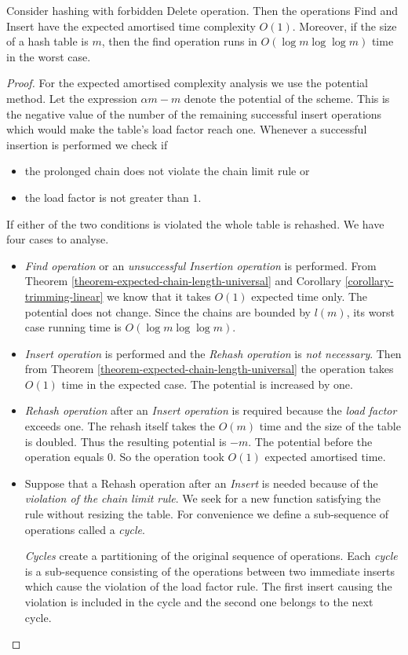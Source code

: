\begin{theorem}
\label{theorem-no-delete-time}
Consider hashing with forbidden Delete operation. Then the operations Find and Insert have the expected amortised time complexity $O(1)$. Moreover, if the size of a hash table is $m$, then the find operation runs in $O(\log m \log \log m)$ time in the worst case.
\end{theorem}
\begin{proof}
For the expected amortised complexity analysis we use the potential method. Let the expression $\alpha m - m$ denote the potential of the scheme. This is the negative value of the number of the remaining successful insert operations which would make the table's load factor reach one. Whenever a successful insertion is performed we check if 
\begin{itemize} 
\item the prolonged chain does not violate the chain limit rule or
\item the load factor is not greater than $1$.
\end{itemize} If either of the two conditions is violated the whole table is rehashed. We have four cases to analyse.
\begin{itemize}
\item \emph{Find operation} or an \emph{unsuccessful Insertion operation} is performed. From Theorem \ref{theorem-expected-chain-length-universal} and Corollary \ref{corollary-trimming-linear} we know that it takes $O(1)$ expected time only. The potential does not change. Since the chains are bounded by $l(m)$, its worst case running time is $O(\log m \log \log m)$.

\item \emph{Insert operation} is performed and the \emph{Rehash operation} is \emph{not necessary}. Then from Theorem \ref{theorem-expected-chain-length-universal} the operation takes $O(1)$ time in the expected case. The potential is increased by one.

\item \emph{Rehash operation} after an \emph{Insert operation} is required because the \emph{load factor} exceeds one. The rehash itself takes the $O(m)$ time and the size of the table is doubled. Thus the resulting potential is $-m$. The potential before the operation equals $0$. So the operation took $O(1)$ expected amortised time.

\item Suppose that a Rehash operation after an \emph{Insert} is needed because of the \emph{violation of the chain limit rule}. We seek for a new function satisfying the rule without resizing the table. For convenience we define a sub-sequence of operations called a \emph{cycle}.
\begin{definition}
\label{cycle}
\emph{Cycles} create a partitioning of the original sequence of operations. Each \emph{cycle} is a sub-sequence consisting of the operations between two immediate inserts which cause the violation of the load factor rule. The first insert causing the violation is included in the cycle and the second one belongs to the next cycle.
\end{definition}
  

\end{itemize}
\end{proof}
